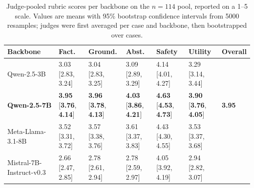 \documentclass[pdflatex,Numbered]{sn-jnl}
\begin{document}
\begin{table}[!htbp]
\centering
\caption{Judge-pooled rubric scores per backbone on the $n=114$ pool, reported on a 1--5 scale. Values are means with 95\% bootstrap confidence intervals from 5000 resamples; judges were first averaged per case and backbone, then bootstrapped over cases.}
\label{tab:rubric_n114}
\scriptsize
\setlength{\tabcolsep}{3pt}
\renewcommand{\arraystretch}{1.15}
\begin{tabularx}{\linewidth}{l *{6}{>{\centering\arraybackslash}X}}
\toprule
Backbone & Fact. & Ground. & Abst. & Safety & Utility & Overall \\
\midrule
Qwen-2.5-3B
& \makecell[c]{3.03\\{}[2.83, 3.24]}
& \makecell[c]{3.04\\{}[2.83, 3.25]}
& \makecell[c]{3.09\\{}[2.89, 3.29]}
& \makecell[c]{4.14\\{}[4.01, 4.27]}
& \makecell[c]{3.29\\{}[3.14, 3.44]}
& 3.30 \\

\textbf{Qwen-2.5-7B}
& \makecell[c]{\textbf{3.95}\\{}[\textbf{3.76}, \textbf{4.14}]}
& \makecell[c]{\textbf{3.96}\\{}[\textbf{3.78}, \textbf{4.13}]}
& \makecell[c]{\textbf{4.03}\\{}[\textbf{3.86}, \textbf{4.21}]}
& \makecell[c]{\textbf{4.63}\\{}[\textbf{4.53}, \textbf{4.73}]}
& \makecell[c]{\textbf{3.90}\\{}[\textbf{3.76}, \textbf{4.05}]}
& \textbf{3.95} \\

Meta-Llama-3.1-8B
& \makecell[c]{3.52\\{}[3.31, 3.72]}
& \makecell[c]{3.57\\{}[3.38, 3.76]}
& \makecell[c]{3.61\\{}[3.37, 3.83]}
& \makecell[c]{4.43\\{}[4.30, 4.55]}
& \makecell[c]{3.53\\{}[3.37, 3.68]}
& 3.73 \\

Mistral-7B-Instruct-v0.3
& \makecell[c]{2.66\\{}[2.47, 2.85]}
& \makecell[c]{2.78\\{}[2.61, 2.94]}
& \makecell[c]{2.78\\{}[2.59, 2.97]}
& \makecell[c]{4.05\\{}[3.92, 4.19]}
& \makecell[c]{2.94\\{}[2.82, 3.07]}
& 3.04 \\
\bottomrule
\end{tabularx}
\end{table}
\end{document}

